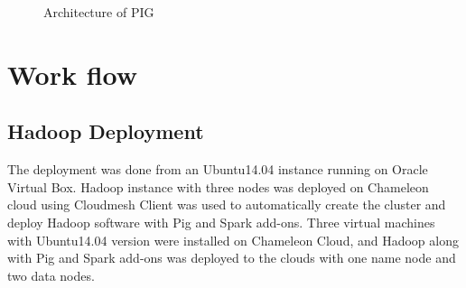 \documentclass[9pt,twocolumn,twoside]{../../styles/osajnl}
\begin{document}
\begin{figure}[htbp]
\centering
{}
\caption{Architecture of PIG \cite{www-pig-fig}}
\label{fig:ansible}
\end{figure}


\section{Work flow}

\subsection{Hadoop Deployment}
The deployment was done from an Ubuntu14.04 instance running on Oracle Virtual Box. Hadoop instance with three nodes was deployed on Chameleon cloud using Cloudmesh Client was used to automatically create the cluster and deploy Hadoop software with Pig and Spark add-ons. Three virtual machines with Ubuntu14.04 version were installed on Chameleon Cloud, and Hadoop along with Pig and Spark add-ons was deployed to the clouds with one name node and two data nodes. 
\end{document}
